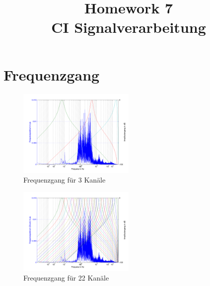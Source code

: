 \documentclass[conference]{IEEEtran}
\begin{document}
%
%
\title{Homework 7\\ CI Signalverarbeitung}

\author{
}


\maketitle

\IEEEpeerreviewmaketitle

\section{Frequenzgang}

\begin{figure}[h]
	\centering
	\includegraphics[width=0.5\textwidth]{img/freq_gang_3.png}
	\caption{Frequenzgang für 3 Kanäle}
	\label{fig:freq-gang-3}
\end{figure}

\begin{figure}[h]
	\centering
	\includegraphics[width=0.5\textwidth]{img/freq_gang_22.png}
	\caption{Frequenzgang für 22 Kanäle}
	\label{fig:freq-gang-22}
\end{figure}
\end{document}
